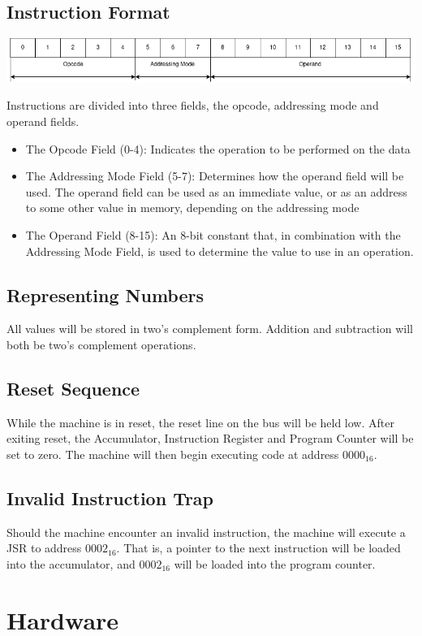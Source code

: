 \documentclass{article}
\begin{document}
    \subsection{Instruction Format}\label{subsec:instruction-format}
    \begin{center}
        \includegraphics[scale=0.40]{img/Instruction_Format}
    \end{center}
    \par Instructions are divided into three fields, the opcode, addressing mode and operand fields.
    \begin{itemize}
        \item The Opcode Field (0-4): Indicates the operation to be performed on the data
        \item The Addressing Mode Field (5-7): Determines how the operand field will be used.
        The operand field can be used as an immediate value, or as an address to some other value in memory,
        depending on the addressing mode
        \item The Operand Field (8-15): An 8-bit constant that, in combination with the Addressing Mode Field, is
        used to determine the value to use in an operation.
    \end{itemize}

    \subsection{Representing Numbers}\label{subsec:representing-numbers}
    \par All values will be stored in two's complement form.
    Addition and subtraction will both be two's complement operations.


    \subsection{Reset Sequence}\label{subsec:reset-sequence}
    \par While the machine is in reset, the reset line on the bus will be held low.
    After exiting reset, the Accumulator, Instruction Register and Program Counter will
    be set to zero.
    The machine will then begin executing code at address $0000_{16}$.


    \subsection{Invalid Instruction Trap}\label{subsec:invalid-instruction-trap}
    \par Should the machine encounter an invalid instruction, the machine will execute a JSR to address $0002_{16}$.
    That is, a pointer to the next instruction will be loaded into the accumulator, and $0002_{16}$ will be loaded
    into the program counter.
    \pagebreak

    
    \pagebreak
    
    

    \section{Hardware}\label{sec:hardware}
    
\end{document}
